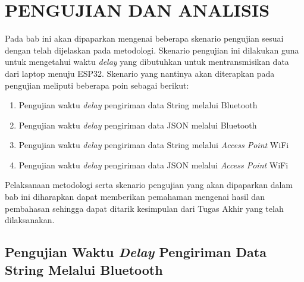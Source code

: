   \chapter{PENGUJIAN DAN ANALISIS}
\label{chap:pengujiananalisis}


Pada bab ini akan dipaparkan mengenai beberapa skenario pengujian sesuai dengan telah dijelaskan pada metodologi. Skenario pengujian ini dilakukan guna untuk mengetahui waktu \emph{delay} yang dibutuhkan untuk mentransmisikan data dari laptop menuju ESP32. Skenario yang nantinya akan diterapkan pada pengujian meliputi beberapa poin sebagai berikut:

\begin{enumerate}
  \item Pengujian waktu \emph{delay} pengiriman data String melalui Bluetooth
  \item Pengujian waktu \emph{delay} pengiriman data JSON melalui Bluetooth
  \item Pengujian waktu \emph{delay} pengiriman data String melalui \emph{Access Point} WiFi
  \item Pengujian waktu \emph{delay} pengiriman data JSON melalui \emph{Access Point} WiFi
\end{enumerate}

Pelaksanaan metodologi serta skenario pengujian yang akan dipaparkan dalam bab ini diharapkan dapat memberikan pemahaman mengenai hasil dan pembahasan sehingga dapat ditarik kesimpulan dari Tugas Akhir yang telah dilaksanakan.


\section{Pengujian Waktu \emph{Delay} Pengiriman Data String Melalui Bluetooth}
\label{sec:delayBluetooth}

